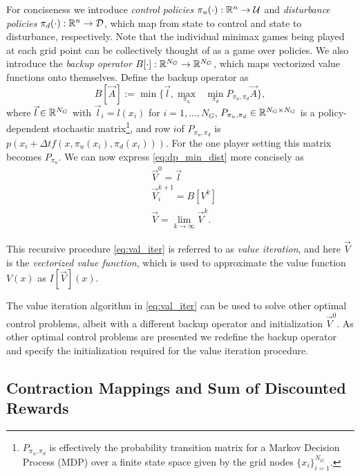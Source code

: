 For conciseness we introduce \emph{control policies} ${\pi_u(\cdot): \mathbb{R}^n \rightarrow \mathcal{U}}$ and \emph{disturbance policies} ${\pi_d(\cdot): \mathbb{R}^n \rightarrow \mathcal{D}}$, which map from state to control and state to disturbance, respectively. Note that the individual minimax games being played at each grid point can be collectively thought of as a game over policies. We also introduce the \emph{backup operator} ${B[\cdot]: \mathbb{R}^{N_G} \rightarrow \mathbb{R}^{N_G}}$, which maps vectorized value functions onto themselves. Define the backup operator as
%
\begin{equation} \label{eq: op_min_dist}
 B[\vec{A}] := \min\{\vec{l},  \underset{\pi_u}{\max}\text{ }\underset{ \pi_d}{\min} P_{\pi_u, \pi_d} \vec{A}\},
\end{equation}%
\noindent where ${\vec{l} \in \mathbb{R}^{N_G}}$ with ${\vec{l}_i = l(x_i)}$ for ${i=1, ..., N_G}$, ${P_{\pi_u, \pi_d} \in \mathbb{R}^{N_G \times N_G}}$ is a policy-dependent stochastic matrix\footnote{$P_{\pi_u, \pi_d}$ is effectively the probability transition matrix for a Markov Decision Process (MDP) over a finite state space given by the grid nodes ${\{x_i\}_{i=1}^{N_G}}$.}, and row $i$of $P_{\pi_u, \pi_d}$ is $p(x_i+\Delta tf(x, \pi_u(x_i), \pi_d(x_i)))$. For the one player setting this matrix becomes $P_{\pi_u}$. We can now express \eqref{eq:dp_min_dist} more concisely as
%
\begin{subequations}\label{eq:val_iter}
\begin{align}
&\vec{V}^{0} = \vec{l}\\
&\vec{V}_{i}^{k+1} = B[V^k] \\
&\vec{V} = \lim_{k\rightarrow \infty} \vec{V}^{k}.
\end{align}
\end{subequations}

This recursive procedure \eqref{eq:val_iter} is referred to as \emph{value iteration}, and here $\vec{V}$ is the \emph{vectorized value function}, which is used to approximate the value function $V(x)$ as $I[\vec{V}](x)$. 

The value iteration algorithm in \eqref{eq:val_iter} can be used to solve other optimal control problems, albeit with a different backup operator and initialization $\vec{V}^{0}$. As other optimal control problems are presented we redefine the backup operator and specify the initialization required for the value iteration procedure.

\subsection{Contraction Mappings and Sum of Discounted Rewards}

